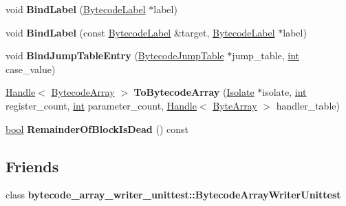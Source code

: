 \begin{DoxyCompactItemize}
\item 
\mbox{\label{classv8_1_1internal_1_1interpreter_1_1BytecodeArrayWriter_a6c8b9165871ebf44c351618373043bd1}} 
void {\bfseries Bind\+Label} (\mbox{\hyperlink{classv8_1_1internal_1_1interpreter_1_1BytecodeLabel}{Bytecode\+Label}} $\ast$label)
\item 
\mbox{\label{classv8_1_1internal_1_1interpreter_1_1BytecodeArrayWriter_abd6e5d6b46f157927fbe7d8e5efae9ce}} 
void {\bfseries Bind\+Label} (const \mbox{\hyperlink{classv8_1_1internal_1_1interpreter_1_1BytecodeLabel}{Bytecode\+Label}} \&target, \mbox{\hyperlink{classv8_1_1internal_1_1interpreter_1_1BytecodeLabel}{Bytecode\+Label}} $\ast$label)
\item 
\mbox{\label{classv8_1_1internal_1_1interpreter_1_1BytecodeArrayWriter_a95841c11c6ffecdf4414393267046959}} 
void {\bfseries Bind\+Jump\+Table\+Entry} (\mbox{\hyperlink{classv8_1_1internal_1_1interpreter_1_1BytecodeJumpTable}{Bytecode\+Jump\+Table}} $\ast$jump\+\_\+table, \mbox{\hyperlink{classint}{int}} case\+\_\+value)
\item 
\mbox{\label{classv8_1_1internal_1_1interpreter_1_1BytecodeArrayWriter_a5d1d24c9f630788612bc43af1c3f4d96}} 
\mbox{\hyperlink{classv8_1_1internal_1_1Handle}{Handle}}$<$ \mbox{\hyperlink{classv8_1_1internal_1_1BytecodeArray}{Bytecode\+Array}} $>$ {\bfseries To\+Bytecode\+Array} (\mbox{\hyperlink{classv8_1_1internal_1_1Isolate}{Isolate}} $\ast$isolate, \mbox{\hyperlink{classint}{int}} register\+\_\+count, \mbox{\hyperlink{classint}{int}} parameter\+\_\+count, \mbox{\hyperlink{classv8_1_1internal_1_1Handle}{Handle}}$<$ \mbox{\hyperlink{classv8_1_1internal_1_1ByteArray}{Byte\+Array}} $>$ handler\+\_\+table)
\item 
\mbox{\label{classv8_1_1internal_1_1interpreter_1_1BytecodeArrayWriter_ad970d8fb172c7475f3b1574d4ca49c13}} 
\mbox{\hyperlink{classbool}{bool}} {\bfseries Remainder\+Of\+Block\+Is\+Dead} () const
\end{DoxyCompactItemize}
\subsection*{Friends}
\begin{DoxyCompactItemize}
\item 
\mbox{\label{classv8_1_1internal_1_1interpreter_1_1BytecodeArrayWriter_ad2da9d2800829396156c2b02372b9772}} 
class {\bfseries bytecode\+\_\+array\+\_\+writer\+\_\+unittest\+::\+Bytecode\+Array\+Writer\+Unittest}
\end{DoxyCompactItemize}


